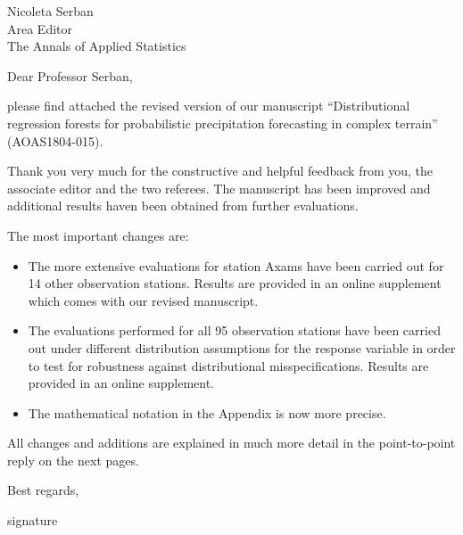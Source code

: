 \documentclass[american,foldmarks=false,noconfig]{uibklttr}
\begin{document}
\begin{letter}{
Nicoleta Serban\\
Area Editor\\
The Annals of Applied Statistics}



\opening{Dear Professor Serban,}

please find attached the revised version of our manuscript 
``Distributional regression forests for probabilistic precipitation 
forecasting in complex terrain'' (AOAS1804-015).

Thank you very much for the constructive and helpful feedback from you, 
the associate editor and the two referees. The manuscript has been 
improved and additional results haven been obtained from further evaluations.

The most important changes are:
\begin{itemize}

\item The more extensive evaluations for station Axams have been 
carried out for 14 other observation stations. Results are 
provided in an online supplement which comes with our revised manuscript.

\item The evaluations performed for all 95 observation stations 
have been carried out under different distribution assumptions 
for the response variable in order to test for robustness against
distributional misspecifications. Results are provided in an 
online supplement.

\item The mathematical notation in the Appendix is now more precise.

\end{itemize}

All changes and additions are explained in much more detail in the
point-to-point reply on the next pages. 

\closing{Best regards,
\vspace*{1cm}
}

\vspace*{-2.8cm}
\hspace*{-0.3cm}signature %

\end{letter}

\newpage
\end{document}
